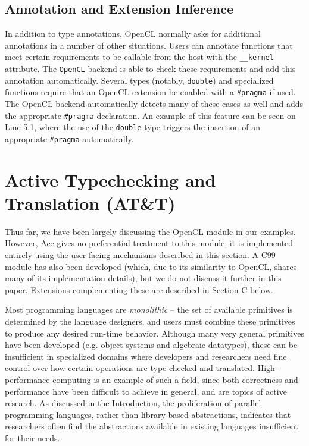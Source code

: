 \documentclass{sig-alternate}
\begin{document}
\subsection{Annotation and Extension Inference}
In addition to type annotations, OpenCL normally asks for additional annotations in a number of other situations.  Users can annotate functions that meet certain requirements to be callable from the host with the \verb|__kernel| attribute. The \verb|OpenCL| backend is able to check these requirements and add this annotation automatically. Several types (notably, \verb|double|) and specialized functions require that an OpenCL extension be enabled with a \verb|#pragma| if used. The OpenCL backend automatically detects many of these cases as well and adds the appropriate \verb|#pragma| declaration. An example of this feature can be seen on Line 5.1, where the use of the \verb|double| type triggers the insertion of an appropriate \verb|#pragma| automatically.

\section{Active Typechecking and\\Translation (AT\&T)}\label{att}
Thus far, we have been largely discussing the OpenCL module in our examples. However, Ace gives no preferential treatment to this module; it is implemented entirely using the user-facing mechanisms described in this section. A C99 module has also been developed (which, due to its similarity to OpenCL, shares many of its implementation details), but we do not discuss it further in this paper. Extensions complementing these are described in Section C below.

Most programming languages are {\em monolithic} -- the set of available primitives is determined by the language designers, and users must combine these primitives to produce any desired run-time behavior. Although many very general primitives have been developed (e.g. object systems and algebraic datatypes), these can be insufficient in specialized domains where developers and researchers need fine control over how certain operations are type checked and translated. High-performance computing is an example of such a field, since both correctness and performance have been difficult to achieve in general, and are topics of active research. As discussed in the Introduction, the proliferation of parallel programming languages, rather than library-based abstractions, indicates that researchers often find the abstractions available in existing languages insufficient for their needs.
\end{document}
